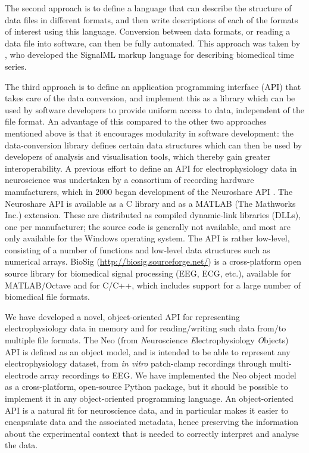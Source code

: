 \documentclass{frontiers}
\newcommand{\latin}[1]{\textit{#1}}
\begin{document}
The second approach is to define a language that can describe the structure of data files in different formats, and then write descriptions of each of the formats of interest using this language.
Conversion between data formats, or reading a data file into software, can then be fully automated.
This approach was taken by \citet{Durka2004}, who developed the SignalML markup language for describing biomedical time series.

The third approach is to define an application programming interface (API) that takes care of the data conversion, and implement this as a library which can be used by software developers to provide uniform access to data, independent of the file format.
An advantage of this compared to the other two approaches mentioned above is that it encourages modularity in software development: the data-conversion library defines certain data structures which can then be used by developers of analysis and visualisation tools, which thereby gain greater interoperability.
A previous effort to define an API for electrophysiology data in neuroscience was undertaken by a consortium of recording hardware manufacturers, which in 2000 began development of the Neuroshare API \citep{neuroshare}.
The Neuroshare API is available as a C library and as a MATLAB (The Mathworks Inc.) extension.
These are distributed as compiled dynamic-link libraries (DLLs), one per manufacturer; the source code is generally not available, and most are only available for the Windows operating system.
The API is rather low-level, consisting of a number of functions and low-level data structures such as numerical arrays. BioSig (\url{http://biosig.sourceforge.net/}) is a cross-platform open source library for biomedical signal processing (EEG, ECG, etc.), available for MATLAB/Octave and for C/C++, which includes support for a large number of biomedical file formats.

We have developed a novel, object-oriented API for representing electrophysiology data in memory and for reading/writing such data from/to multiple file formats.
The Neo (from \emph{N}euroscience \emph{E}lectrophysiology \emph{O}bjects) API is defined as an object model, and is intended to be able to represent any electrophysiology dataset, from \latin{in vitro} patch-clamp recordings through multi-electrode array recordings to EEG.
We have implemented the Neo object model as a cross-platform, open-source Python package, but it should be possible to implement it in any object-oriented programming language.
An object-oriented API is a natural fit for neuroscience data, and in particular makes it easier to encapsulate data and the associated metadata, hence preserving the information about the experimental context that is needed to correctly interpret and analyse the data.
\end{document}
